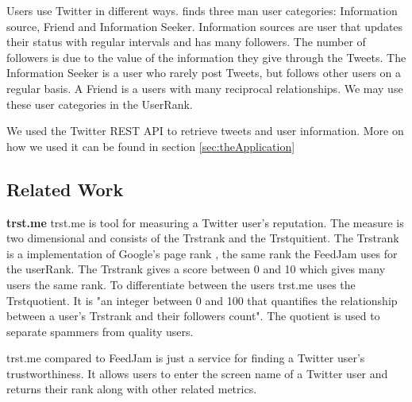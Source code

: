 Users use Twitter in different ways. \citet{Akshay2007} finds three man user categories: Information source, Friend and Information Seeker. Information sources are user that updates their status with regular intervals and has many followers. The number of followers is due to the value of the information they give through the Tweets. The Information Seeker is a user who rarely post Tweets, but follows other users on a regular basis. A Friend is a users with many reciprocal relationships. We may use these user categories in the UserRank. 


We used the Twitter REST API to retrieve tweets and user information. More on how we used it can be found in section \ref{sec:theApplication}  




\subsection{Related Work}
{\bf trst.me} \newline
trst.me \citet{Infochimps2012b} is tool for measuring a Twitter user's reputation. The measure is two dimensional and consists of the Trstrank and the Trstquitient. The Trstrank is a implementation of Google's page rank \citep{Infochimps2012a}, the same rank the FeedJam uses for the userRank. The Trstrank gives a score between 0 and 10 which gives many users the same rank. To differentiate between the users trst.me uses the Trstquotient. It is "an integer between 0 and 100 that quantifies the relationship between a user's Trstrank and their followers count"\citep{Infochimps2012}. The quotient is used to separate spammers from quality users. 

trst.me compared to FeedJam is just a service for finding a Twitter user's trustworthiness. It allows users to enter the screen name of a Twitter user and returns their rank along with other related metrics.  

